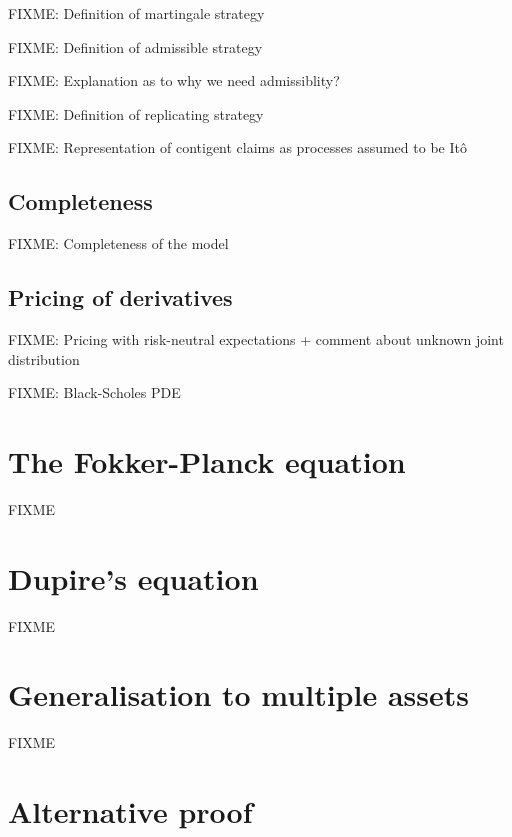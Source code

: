 \documentclass[a4paper]{article}
\begin{document}
FIXME: Definition of martingale strategy

FIXME: Definition of admissible strategy

FIXME: Explanation as to why we need admissiblity?

FIXME: Definition of replicating strategy

FIXME: Representation of contigent claims as processes assumed to be It\^o

\subsection{Completeness}

FIXME: Completeness of the model

\subsection{Pricing of derivatives}

FIXME: Pricing with risk-neutral expectations + comment about unknown joint distribution

FIXME: Black-Scholes PDE

\section{The Fokker-Planck equation}


FIXME

\section{Dupire's equation}


FIXME

\section{Generalisation to multiple assets}


FIXME

\section{Alternative proof}
\end{document}
